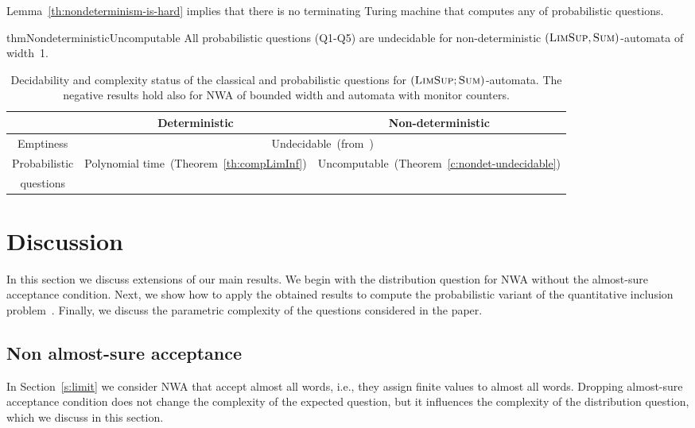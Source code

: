 \documentclass{lmcs}
\newcommand{\fsum}{\textsc{Sum}}
\newcommand{\flimsup}{\textsc{LimSup}}
\newcommand{\uncomp}{Uncomputable}
\begin{document}
Lemma~\ref{th:nondeterminism-is-hard} implies that there is no terminating Turing machine that computes any of probabilistic questions.


\begin{restatable}{thm}{NondeterministicUncomputable}\label{c:nondet-undecidable}
All probabilistic questions (Q1-Q5) are undecidable for non-deterministic
$(\flimsup,\fsum)$-automata of width~1.
\end{restatable}



\begin{table}
\centering
\begin{tabular}{|c|c|c|} \hline & Deterministic & Non-deterministic \\
\hline Emptiness & \multicolumn{2}{|c|}{Undecidable~(from~\cite{nested})} \\
\hline Probabilistic & \multirow{2}{*}{Polynomial time~(Theorem~\ref{th:compLimInf})} & \multirow{2}{*}{\uncomp~(Theorem~\ref{c:nondet-undecidable})} \\
questions & & \\
\hline \end{tabular}
\caption{Decidability and complexity status of the classical and probabilistic questions for $(\flimsup;\fsum)$-automata.
The negative results hold also for NWA of bounded width and automata with monitor counters.}\label{tab2}
\vspace{-1em}
\end{table}




\section{Discussion}\label{s:discussion}
In this section we discuss extensions of our main results.
We begin with the distribution question for NWA without the almost-sure acceptance condition.
Next, we show how to apply the obtained results to compute the probabilistic variant of the quantitative inclusion problem~\cite{Chatterjee08quantitativelanguages,nested}.
Finally, we discuss the parametric complexity of the questions considered in the paper.


\subsection{Non almost-sure acceptance}\label{s:no-almost-surely-accepting}
In Section~\ref{s:limit} we consider NWA that accept almost all words, i.e., they assign finite values to almost all words.
Dropping almost-sure acceptance condition does not change the complexity of the expected question, but it influences the complexity of the distribution question, which we discuss in this section.
\end{document}
